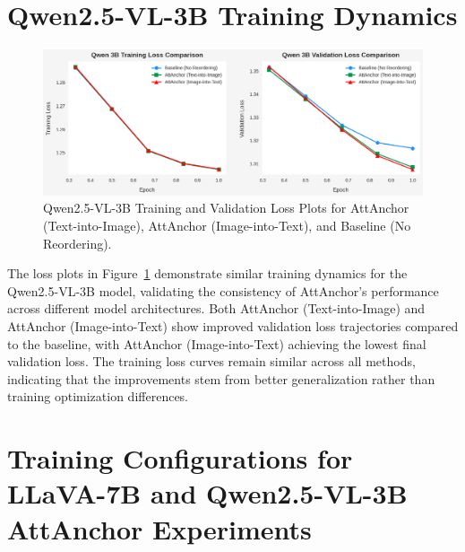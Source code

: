 \documentclass[11pt]{article}
\begin{document}
% 



\section{Qwen2.5-VL-3B Training Dynamics}
\label{app:qwen_training_dynamics}

\begin{figure}[H]
    \centering
    \includegraphics[width=1\linewidth]{iclr2026/qwenloss.png}
    \caption{Qwen2.5-VL-3B Training and Validation Loss Plots for AttAnchor (Text-into-Image), AttAnchor (Image-into-Text), and Baseline (No Reordering).}
    \label{fig:qwen_loss_plot}
\end{figure}

The loss plots in Figure~\ref{fig:qwen_loss_plot} demonstrate similar training dynamics for the Qwen2.5-VL-3B model, validating the consistency of AttAnchor's performance across different model architectures. Both AttAnchor (Text-into-Image) and AttAnchor (Image-into-Text) show improved validation loss trajectories compared to the baseline, with AttAnchor (Image-into-Text) achieving the lowest final validation loss. The training loss curves remain similar across all methods, indicating that the improvements stem from better generalization rather than training optimization differences.




\section{Training Configurations for LLaVA-7B and Qwen2.5-VL-3B AttAnchor Experiments}
\label{app:training_configs}
\end{document}
